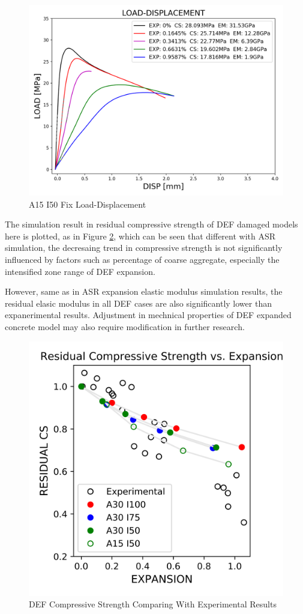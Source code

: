 \begin{figure}[ht!]
\centering
\includegraphics[width=.8\linewidth]{Files/exp_3D/DEF/S13A15FIXX0-LOAD-DISPLACEMENT.png}
  \caption{A15 I50 Fix Load-Displacement}
  \label{fig:A15X0FIX_LD}
\end{figure}

\clearpage

The simulation result in residual compressive strength of DEF damaged models here is plotted, as in Figure \ref{DEF_CS_summary}, which can be seen that different with ASR simulation, the decresaing trend in compressive strength is not significantly influenced by factors such as percentage of coarse aggregate, especially the intensified zone range of DEF expansion.

However, same as in ASR expansion elastic modulus simulation results, the residual elasic modulus in all DEF cases are also significantly lower than expanerimental results. Adjustment in mechnical properties of DEF expanded concrete model may also require modification in further research.

\begin{figure}[ht!]
\centering
\includegraphics[width=.8\linewidth]{Files/CS_plot/DEFCS_all.png}
  \caption{DEF Compressive Strength Comparing With Experimental Results}
  \label{DEF_CS_summary}
\end{figure}


